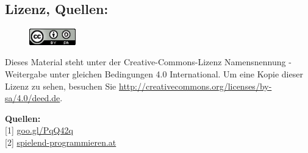 \subsection*{Lizenz, Quellen:}

\begin{figure}
\includegraphics[width=2cm]{counterstrike/ccbysa88x31.png}
\end{figure}
Dieses Material steht unter der Creative-Commons-Lizenz Namensnennung - Weitergabe unter gleichen Bedingungen 4.0 International. Um eine Kopie dieser Lizenz zu sehen, besuchen Sie \url{http://creativecommons.org/licenses/by-sa/4.0/deed.de}.

\textbf{Quellen:} \\
{[}1{]} \href{https://plus.google.com/108488461844417773815/about}{goo.gl/PqQ42q} \\ %
{[}2{]} \href{http://spielend-programmieren.at}{spielend-programmieren.at} \\







